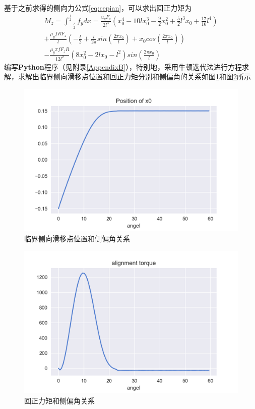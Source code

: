 \documentclass[paper=a4, fontsize=11pt]{scrartcl} %
\numberwithin{equation}{section} %
\numberwithin{figure}{section} %
\numberwithin{table}{section} %
\begin{document}
基于之前求得的侧向力公式\ref{eq:cepian}，可以求出回正力矩为
\begin{equation}
\begin{split}
M_z = \int_{-\frac{l}{2}}^{\frac{l}{2}} f_y dx = \frac{u_yF_z}{2l^3}\left(x_0^4 -10lx_0^3 -\frac{9}{2}x_0^2 + \frac{5}{2}l^3x_0 + \frac{17}{16}l^4 \right) \\
+ \frac{\mu_y fRF_z}{l} \left(-\frac{l}{2} + \frac{l}{2\pi}sin(\frac{2\pi x_0}{l}) + x_0 cos(\frac{2\pi x_0}{l}) \right) \\
-\frac{\mu_y \pi fF_zR}{12l^2}(8x_0^2 - 2lx_0 - l^2)sin(\frac{2\pi x_0}{l})
\end{split}
\end{equation}
编写\textbf{Python}程序（见附录\ref{AppendixB}），特别地，采用牛顿迭代法进行方程求解，求解出临界侧向滑移点位置和回正力矩分别和侧偏角的关系如图\ref{fig:2-1}和图\ref{fig:2-2}所示
\begin{figure}[ht]
\centering
\includegraphics[width=\textwidth]{2-1.png}
\caption{临界侧向滑移点位置和侧偏角关系}
\label{fig:2-1}
\end{figure}
\begin{figure}[ht]
\centering
\includegraphics[width=\textwidth]{2-2.png}
\caption{回正力矩和侧偏角关系}
\label{fig:2-2}
\end{figure}
\end{document}
